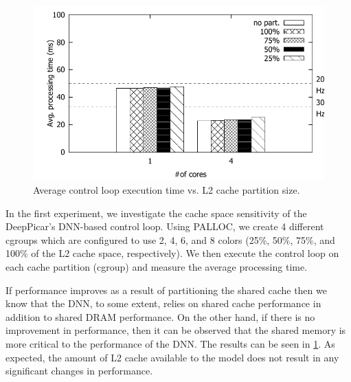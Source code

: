 

\begin{figure}[h]
  \centering
  \includegraphics[width=.45\textwidth]{figs/palloc_multicore}
  \caption{Average control loop execution time vs.  %
    L2 cache partition size.}
  \label{fig:palloc_multicore}
\end{figure}

In the first experiment, we investigate the cache space sensitivity of
the DeepPicar's DNN-based control loop. Using PALLOC, we create 4
different cgroups which are configured to use 2, 4,
6, and 8 colors (25\%, 50\%, 75\%, and 100\% of the L2 cache
space, respectively). We then execute the control loop on each cache
partition (cgroup) and measure the average processing time. 

If performance improves as a result of partitioning the shared cache 
then we know that the DNN, to some extent, relies on shared cache 
performance in addition to shared DRAM performance. On the other 
hand, if there is no improvement in performance, then it can be 
observed that the shared memory is more critical to the performance 
of the DNN.
The results can be seen in 
\ref{fig:palloc_multicore}. As expected, the amount of L2 cache 
available to the model does not result in any significant changes in 
performance. 


